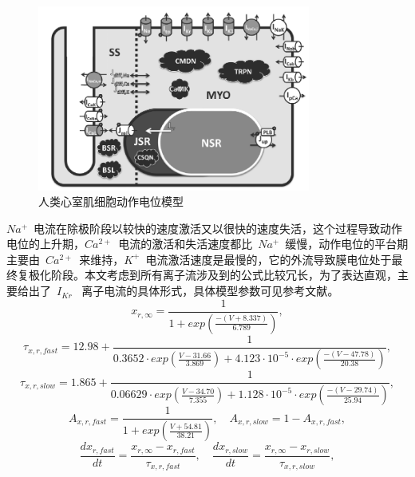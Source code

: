 \documentclass[twoside,UTF8]{nputhesis}
\begin{document}
\begin{figure}[ht]
	\centering
	\includegraphics[width=0.8\textwidth,height=0.5\textwidth]{figures/liziliu.PNG}
	\hspace{0.04\textwidth}
	\caption{人类心室肌细胞动作电位模型\cite{ORD2011}}
	\label{fig:1.1} %
\end{figure}
$Na^{+}$~电流在除极阶段以较快的速度激活又以很快的速度失活，这个过程导致动作电位的上升期，$Ca^{2+}$~电流的激活和失活速度都比~$Na^{+}$~缓慢，动作电位的平台期主要由~$Ca^{2+}$~来维持，$K^{+}$~电流激活速度是最慢的，它的外流导致膜电位处于最终复极化阶段。本文考虑到所有离子流涉及到的公式比较冗长，为了表达直观，主要给出了~$I_{Kr}$~ 离子电流的具体形式，具体模型参数可见参考文献\cite{ORD2011}。
\begin{equation*}
x_{r,\infty}=\frac{1}{1+exp(\frac{-(V+8.337)}{6.789})},
\end{equation*}
\begin{equation*}
\tau_{x,r,fast}=12.98+\frac{1}{0.3652\cdot exp(\frac{V-31.66}{3.869})+4.123\cdot10^{-5}\cdot exp(\frac{-(V-47.78)}{20.38})},
\end{equation*}
\begin{equation*}
\tau_{x,r,slow}=1.865+\frac{1}{0.06629\cdot exp(\frac{V-34.70}{7.355})+1.128\cdot10^{-5}\cdot exp(\frac{-(V-29.74)}{25.94})},
\end{equation*}
\begin{equation*}
A_{x,r,fast}=\frac{1}{1+exp(\frac{V+54.81}{38.21})},\quad A_{x,r,slow}=1-A_{x,r,fast},
\end{equation*}
\begin{equation}
\frac{dx_{r,fast}}{dt}=\frac{x_{r,\infty}-x_{r,fast}}{\tau_{x,r,fast}}, \quad \frac{dx_{r,slow}}{dt}=\frac{x_{r,\infty}-x_{r,slow}}{\tau_{x,r,slow}},
\label{rh}
\end{equation}
\end{document}
